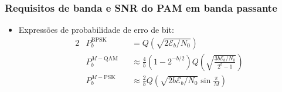 \begin{frame}
	\frametitle{Requisitos de banda e SNR do PAM em banda passante}

	\begin{itemize}
	    \item Expressões de probabilidade de erro de bit:
	    \begin{alignat*}{2}
		&P_b^{\text{BPSK}} &&= Q(\sqrt{2\mathcal{E}_b/N_0}) \\
		&P_b^{M-\text{QAM}} &&\approx \frac{4}{b} (1-2^{-b/2}) Q\left(\sqrt{\frac{3b\mathcal{E}_b/N_0}{2^b-1}} \right) \\
		&P_b^{M-\text{PSK}} &&\approx \frac{2}{b} Q\left(\sqrt{2b\mathcal{E}_b/N_0} \sin\frac{\pi}{M} \right)
	    \end{alignat*}

	\end{itemize}	
\end{frame}

